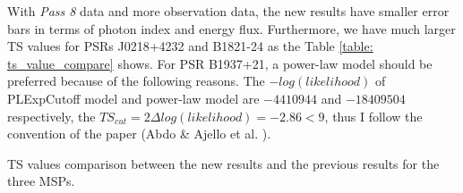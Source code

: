 \documentclass[12pt]{report}
\newcommand{\mycaption}[1]{\protect \caption{#1}}
\begin{document}
    \begin{table}[!htp]
      \centering 
      \caption{Fit results of power-law model for PSR B1937+21. Since the previous paper 
        does not show the photon flux, I cannot calculate the error bars of photon flux for 
        the previous value.}
      \label{table: final_results_j1939_pl}
    \end{table}
  
    With \textit{Pass 8} data and more observation data, the new results have smaller error bars
    in terms of photon index and energy flux. Furthermore, we have much larger TS values for 
    PSRs J0218+4232 and B1821-24 as the Table \ref{table: ts_value_compare} shows.
    For PSR B1937+21, a power-law model should be preferred because of the following reasons. 
    The $-log(likelihood)$ of PLExpCutoff model and power-law model are $-4410944$ and 
    $-18409504$ respectively, the $TS_{cut} = 2\Delta log(likelihood) = -2.86 < 9$,  thus I 
    follow the convention of the paper (Abdo \& Ajello et al. \cite{2013ApJS..208...17A}). 

    \begin{table}[!htp]
      \centering
        \mycaption{TS values comparison between the new results and the previous results for 
          the three MSPs. }
        \label{table: ts_value_compare}        
    \end{table}  
\end{document}
